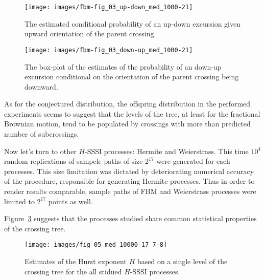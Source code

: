 \begin{figure}[htb]\begin{center}
    \texttt{[image: images/fbm-fig\_03\_up-down\_med\_1000-21]}
    \caption{The estimated conditional probability of an up-down excursion given upward
    orientation of the parent crossing.}
\label{fig:fbm_offspring_up_down}
\end{center}\end{figure}

\begin{figure}[htb]\begin{center}
    \texttt{[image: images/fbm-fig\_03\_down-up\_med\_1000-21]}
    \caption{The box-plot of the estimates of the probability of an down-up excursion
    conditional on the orientation of the parent crossing being downward.}
\label{fig:fbm_offspring_down_up}
\end{center}\end{figure}

As for the conjectured distribution, the offspring distribution in the performed
experiments seems to suggest that the levels of the tree, at least for the fractional
Brownian motion, tend to be populated by crossings with more than predicted number
of subcrossings.

Now let's turn to other $H$-SSSI processes: Hermite and Weierstrass. This time $10^4$
random replications of sampele paths of size $2^{17}$ were generated for each processes.
This size limitation was dictated by deteriorating numerical accuracy of the procedure,
responsible for generating Hermite processes. Thus in order to render results comparable,
sample paths of FBM and Weierstrass processes were limited to $2^{17}$ points as well. 

Figure~\ref{fig:all_hurst_crossing_tree} suggests that the processes studied share common
statistical properties of the crossing tree.
\begin{figure}[htb]\begin{center}
    \texttt{[image: images/fig\_05\_med\_10000-17\_7-8]}
    \caption{Estimates of the Hurst exponent $H$ based on a single level of the crossing tree for
    the all stidued $H$-SSSI processes.}
\label{fig:all_hurst_crossing_tree}
\end{center}\end{figure}

